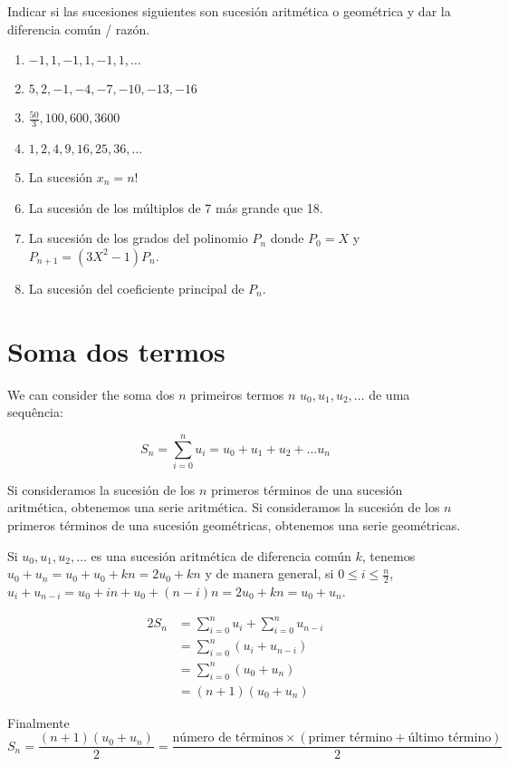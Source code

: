 Indicar si las sucesiones siguientes son sucesión aritmética o geométrica y
dar la diferencia común / razón.

\begin{enumerate}
\item $-1, 1, -1, 1, -1, 1, \ldots$
\item $5, 2, -1, -4, -7, -10, -13, -16$
\item $\frac{50}{3}, 100, 600, 3600$
\item $1, 2, 4, 9, 16, 25, 36, \ldots$
\item La sucesión $x_n = n!$
\item La sucesión de los múltiplos de 7 más grande que 18.
\item La sucesión de los grados del polinomio $P_n$ donde
  $P_0 = X$ y $P_{n+1} = {(3X^2 - 1)} P_n$.
\item La sucesión del coeficiente principal de $P_n$.
\end{enumerate}

\section{Soma dos termos}

We can consider the soma dos $n$ primeiros termos $n$ $u_0, u_1, u_2, \ldots$
de uma sequência:

$$S_n = \sum_{i=0}^n u_i = u_0 + u_1 + u_2 + \ldots u_n$$

Si consideramos la sucesión de los $n$ primeros términos de una sucesión
aritmética, obtenemos una serie aritmética. Si consideramos la sucesión de los
$n$ primeros términos de una sucesión geométricas, obtenemos una serie
geométricas.

Si $u_0, u_1, u_2, \ldots$ es una sucesión aritmética de diferencia común $k$,
tenemos $u_0 + u_n = u_0 + u_0 + kn = 2u_0 + kn$ y de manera general, si
$0 \leq i \leq \frac{n}{2}$,
$u_i + u_{n-i} = u_0 + {in} + u_0 + {(n-i)}n = 2u_0 + kn = u_0 + u_n$.

$$
\begin{aligned}
2S_n &= \sum_{i=0}^n u_i + \sum_{i=0}^n u_{n-i}\\
     &= \sum_{i=0}^n \left(u_i + u_{n-i}\right) \\
     &= \sum_{i=0}^n {(u_0 + u_n)} \\
     &= {(n+1)}{(u_0 + u_n)}
\end{aligned}
$$

Finalmente
$$
S_n = \frac{{(n+1)}{(u_0+u_n)}}{2} =
\frac{\text{número de términos} \times
\left(\text{primer término} + \text{último término}\right)}{2}
$$

